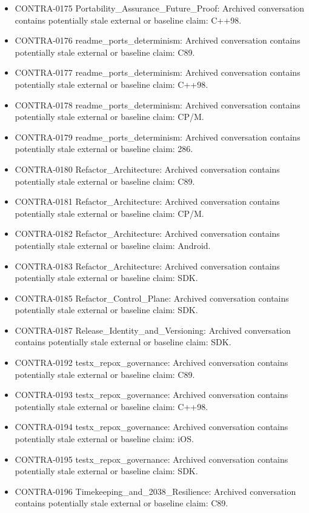 \documentclass[11pt,a4paper]{report}
\begin{document}
\begin{itemize}
\item CONTRA-0175 Portability\_Assurance\_Future\_Proof: Archived conversation contains potentially stale external or baseline claim: C++98.
\item CONTRA-0176 readme\_ports\_determinism: Archived conversation contains potentially stale external or baseline claim: C89.
\item CONTRA-0177 readme\_ports\_determinism: Archived conversation contains potentially stale external or baseline claim: C++98.
\item CONTRA-0178 readme\_ports\_determinism: Archived conversation contains potentially stale external or baseline claim: CP/M.
\item CONTRA-0179 readme\_ports\_determinism: Archived conversation contains potentially stale external or baseline claim: 286.
\item CONTRA-0180 Refactor\_Architecture: Archived conversation contains potentially stale external or baseline claim: C89.
\item CONTRA-0181 Refactor\_Architecture: Archived conversation contains potentially stale external or baseline claim: CP/M.
\item CONTRA-0182 Refactor\_Architecture: Archived conversation contains potentially stale external or baseline claim: Android.
\item CONTRA-0183 Refactor\_Architecture: Archived conversation contains potentially stale external or baseline claim: SDK.
\item CONTRA-0185 Refactor\_Control\_Plane: Archived conversation contains potentially stale external or baseline claim: SDK.
\item CONTRA-0187 Release\_Identity\_and\_Versioning: Archived conversation contains potentially stale external or baseline claim: SDK.
\item CONTRA-0192 testx\_repox\_governance: Archived conversation contains potentially stale external or baseline claim: C89.
\item CONTRA-0193 testx\_repox\_governance: Archived conversation contains potentially stale external or baseline claim: C++98.
\item CONTRA-0194 testx\_repox\_governance: Archived conversation contains potentially stale external or baseline claim: iOS.
\item CONTRA-0195 testx\_repox\_governance: Archived conversation contains potentially stale external or baseline claim: SDK.
\item CONTRA-0196 Timekeeping\_and\_2038\_Resilience: Archived conversation contains potentially stale external or baseline claim: C89.

\end{itemize}
\end{document}
